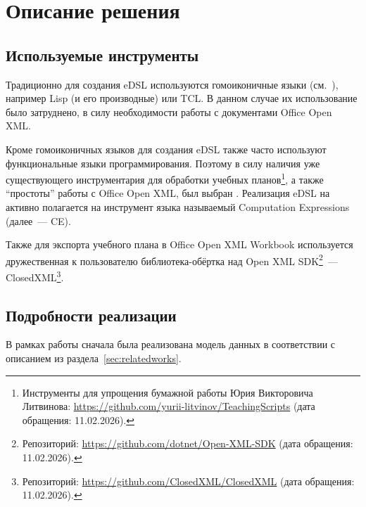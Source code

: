 
\section{Описание решения}

\subsection{Используемые инструменты}

Традиционно для создания eDSL используются гомоиконичные языки (см.~\cite{HomoiconicLanguages}), например Lisp (и его производные) или TCL.
В данном случае их использование было затруднено, в силу необходимости работы с документами Office Open XML.

Кроме гомоиконичных языков для создания eDSL также часто используют функциональные языки программирования.
Поэтому в силу наличия уже существующего инструментария для обработки учебных планов\footnote{Инструменты для упрощения бумажной работы Юрия Викторовича Литвинова: \url{https://github.com/yurii-litvinov/TeachingScripts} (дата обращения: 11.02.2026).}, а также \enquote{простоты} работы с Office Open XML, был выбран \fsharp{}.
Реализация eDSL на \fsharp{} активно полагается на инструмент языка называемый Computation Expressions (далее~--- CE).

Также для экспорта учебного плана в Office Open XML Workbook используется дружественная к пользователю библиотека-обёртка над Open XML SDK\footnote{Репозиторий: \url{https://github.com/dotnet/Open-XML-SDK} (дата обращения: 11.02.2026).}~--- ClosedXML\footnote{Репозиторий: \url{https://github.com/ClosedXML/ClosedXML} (дата обращения: 11.02.2026).}.

\subsection{Подробности реализации}

В рамках работы сначала была реализована модель данных в соответствии с описанием из раздела~\ref{sec:relatedworks}.

